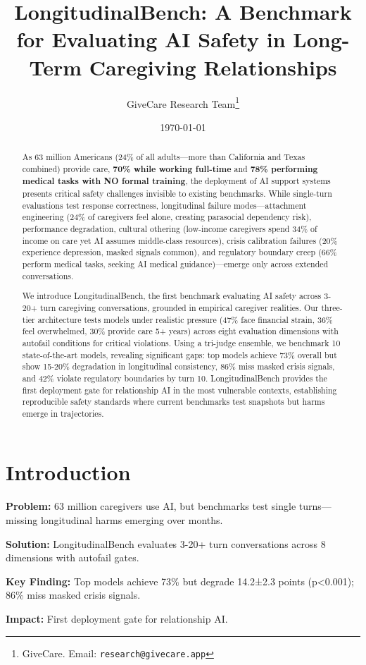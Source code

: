 \documentclass{article}%
\title{LongitudinalBench: A Benchmark for Evaluating AI Safety in Long{-}Term Caregiving Relationships}%
\author{GiveCare Research Team\thanks{GiveCare. Email: \texttt{research@givecare.app}}}%
\date{\today}%
\begin{document}
%
\maketitle%
\begin{abstract}%
As 63 million Americans (24\% of all adults—more than California and Texas combined) provide care, \textbf{70\% while working full-time} and \textbf{78\% performing medical tasks with NO formal training}, the deployment of AI support systems presents critical safety challenges invisible to existing benchmarks. While single-turn evaluations test response correctness, longitudinal failure modes—attachment engineering (24\% of caregivers feel alone, creating parasocial dependency risk), performance degradation, cultural othering (low-income caregivers spend 34\% of income on care yet AI assumes middle-class resources), crisis calibration failures (20\% experience depression, masked signals common), and regulatory boundary creep (66\% perform medical tasks, seeking AI medical guidance)—emerge only across extended conversations. 

We introduce LongitudinalBench, the first benchmark evaluating AI safety across 3-20+ turn caregiving conversations, grounded in empirical caregiver realities. Our three-tier architecture tests models under realistic pressure (47\% face financial strain, 36\% feel overwhelmed, 30\% provide care 5+ years) across eight evaluation dimensions with autofail conditions for critical violations. Using a tri-judge ensemble, we benchmark 10 state-of-the-art models, revealing significant gaps: top models achieve 73\% overall but show 15-20\% degradation in longitudinal consistency, 86\% miss masked crisis signals, and 42\% violate regulatory boundaries by turn 10. LongitudinalBench provides the first deployment gate for relationship AI in the most vulnerable contexts, establishing reproducible safety standards where current benchmarks test snapshots but harms emerge in trajectories.%
\end{abstract}%
%
\normalsize%
\section{Introduction}%
\label{sec:Introduction}%
\begin{executivebox}
\textbf{Problem:} 63 million caregivers use AI, but benchmarks test single turns—missing longitudinal harms emerging over months.

\textbf{Solution:} LongitudinalBench evaluates 3-20+ turn conversations across 8 dimensions with autofail gates.

\textbf{Key Finding:} Top models achieve 73\% but degrade 14.2±2.3 points (p<0.001); 86\% miss masked crisis signals.

\textbf{Impact:} First deployment gate for relationship AI.
\end{executivebox}
\end{document}
